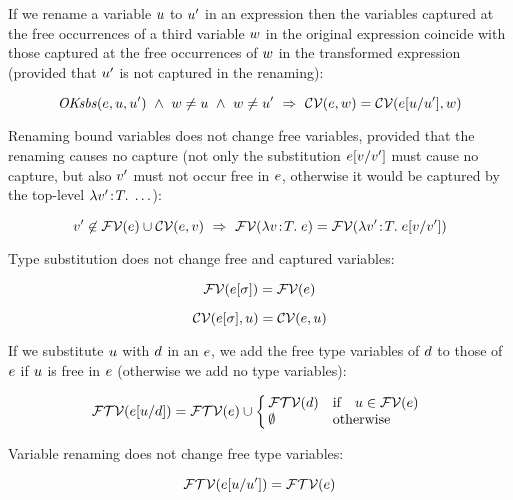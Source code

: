 If we rename a variable $u$ to $u'$ in an expression then the
variables captured at the free occurrences of a third variable $w$ in the
original expression coincide with those captured at the free occurrences of
$w$ in the transformed expression (provided that $u'$ is not captured
in the renaming):

\begin{theorem}\label{thm-capt-rename2}
\[
\mathit{OKsbs}(e,u,u')\ \wedge\ 
w\neq u\ \wedge\ 
w\neq u'\ \Rightarrow\ 
\mathcal{CV}(e,w)=\mathcal{CV}(e[u/u'],w)
\]
\end{theorem}

Renaming bound variables does not change free variables, provided that the
renaming causes no capture (not only the substitution
$e[v/v']$ must cause no capture, but also $v'$ must not
occur free in $e$, otherwise it would be captured by the top-level
$\lambda v'\!:\!T.\;\ldots$):

\begin{theorem}\label{thm-alpha-same-free-vars}
\[
v'\not\in\mathcal{FV}(e)\cup\mathcal{CV}(e,v)\ \Rightarrow\ 
\mathcal{FV}(\lambda v\!:\!T.\;e)=\mathcal{FV}(\lambda v'\!:\!T.\;e[v/v'])
\]
\end{theorem}

Type substitution does not change free and captured variables:

\begin{theorem}\label{thm-tsbs-same-free-vars}
\[
\mathcal{FV}(e[\sigma])=\mathcal{FV}(e)
\]
\end{theorem}

\begin{theorem}\label{thm-tsbs-same-capt-vars}
\[
\mathcal{CV}(e[\sigma],u)=\mathcal{CV}(e,u)
\]
\end{theorem}

If we substitute $u$ with $d$ in an $e$, we add the free type
variables of $d$ to those of $e$ if $u$ is free in $e$
(otherwise we add no type variables):

\begin{theorem}\label{thm-ftvar-of-esbs}
{\rm
\[
\mathcal{FTV}(e[u/d])=
\mathcal{FTV}(e)\cup\left\{\!\!\begin{array}{ll} \mathcal{FTV}(d) & \mbox{if}\quad u\in\mathcal{FV}(e)\\ \emptyset & \mbox{otherwise} \end{array}\right.
\]
}
\end{theorem}

Variable renaming does not change free type variables:

\begin{theorem}\label{thm-rename-same-free-tvars}
\[
\mathcal{FTV}(e[u/u'])=\mathcal{FTV}(e)
\]
\end{theorem}

